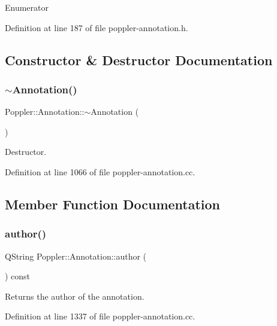 \begin{DoxyEnumFields}{Enumerator}
\end{DoxyEnumFields}


Definition at line 187 of file poppler-\/annotation.\+h.



\subsection{Constructor \& Destructor Documentation}
\mbox{\label{class_poppler_1_1_annotation_a1594b95bca33b18fae1bdc1606e28985}} 
\subsubsection{\texorpdfstring{$\sim$\+Annotation()}{~Annotation()}}
{\footnotesize\ttfamily Poppler\+::\+Annotation\+::$\sim$\+Annotation (\begin{DoxyParamCaption}{ }\end{DoxyParamCaption})\hspace{0.3cm}{\ttfamily [virtual]}}

Destructor. 

Definition at line 1066 of file poppler-\/annotation.\+cc.



\subsection{Member Function Documentation}
\mbox{\label{class_poppler_1_1_annotation_aa14606418f3fb5a1ab0a52223c6e1511}} 
\subsubsection{\texorpdfstring{author()}{author()}}
{\footnotesize\ttfamily Q\+String Poppler\+::\+Annotation\+::author (\begin{DoxyParamCaption}{ }\end{DoxyParamCaption}) const}

Returns the author of the annotation. 

Definition at line 1337 of file poppler-\/annotation.\+cc.

